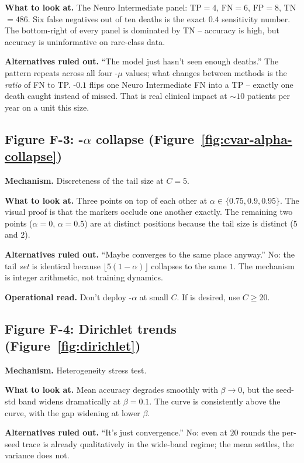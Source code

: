 \textbf{What to look at.} The Neuro Intermediate panel: TP$=4$,
FN$=6$, FP$=8$, TN$=486$. Six false negatives out of ten deaths is
the exact $0.4$ sensitivity number. The bottom-right of every
panel is dominated by TN -- accuracy is high, but accuracy is
uninformative on rare-class data.

\textbf{Alternatives ruled out.} ``The model just hasn't seen
enough deaths.'' The pattern repeats across all four
\fedprox{}-$\mu$ values; what changes between methods is the
\emph{ratio} of FN to TP. \fedprox{}-$0.1$ flips one Neuro
Intermediate FN into a TP -- exactly one death caught instead of
missed. That is real clinical impact at $\sim$$10$ patients per
year on a unit this size.

\subsection{Figure F-3: \cvar{}-$\alpha$ collapse
(Figure~\ref{fig:cvar-alpha-collapse})}
\textbf{Mechanism.} Discreteness of the tail size at $C\!=\!5$.

\textbf{What to look at.} Three points on top of each other at
$\alpha\!\in\!\{0.75, 0.9, 0.95\}$. The visual proof is that the
markers occlude one another exactly. The remaining two points
($\alpha\!=\!0$, $\alpha\!=\!0.5$) are at distinct positions
because the tail size is distinct ($5$ and $2$).

\textbf{Alternatives ruled out.} ``Maybe \cvar{} converges to the
same place anyway.'' No: the tail \emph{set} is identical because
$\lfloor 5(1-\alpha) \rfloor$ collapses to the same $1$. The
mechanism is integer arithmetic, not training dynamics.

\textbf{Operational read.} Don't deploy \cvar{}-$\alpha$ at small
$C$. If \cvar{} is desired, use $C \geq 20$.

\subsection{Figure F-4: Dirichlet trends
(Figure~\ref{fig:dirichlet})}
\textbf{Mechanism.} Heterogeneity stress test.

\textbf{What to look at.} Mean accuracy degrades smoothly with
$\beta\!\to\!0$, but the seed-std band widens dramatically at
$\beta\!=\!0.1$. The \fedprox{} curve is consistently above the
\fedavg{} curve, with the gap widening at lower $\beta$.

\textbf{Alternatives ruled out.} ``It's just convergence.'' No:
even at $20$ rounds the per-seed trace is already qualitatively in
the wide-band regime; the mean settles, the variance does not.

